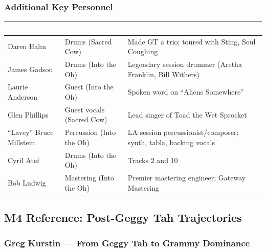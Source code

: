 \documentclass[11pt,letterpaper]{article}
\newcommand{\tableheader}[1]{\textbf{\sffamily\textcolor{white}{#1}}}
\begin{document}
\subsubsection{Additional Key Personnel}

\begin{center}
\begin{tabularx}{\textwidth}{L{3cm}L{3cm}X}
\toprule
{}
\tableheader{Name} & \tableheader{Role} & \tableheader{Note} \\
\midrule
Daren Hahn & Drums (Sacred Cow) & Made GT a trio; toured with Sting, Soul Coughing \\
James Gadson & Drums (Into the Oh) & Legendary session drummer (Aretha Franklin, Bill Withers) \\
Laurie Anderson & Guest (Into the Oh) & Spoken word on ``Aliens Somewhere'' \\
Glen Phillips & Guest vocals (Sacred Cow) & Lead singer of Toad the Wet Sprocket \\
``Lavey'' Bruce Millstein & Percussion (Into the Oh) & LA session percussionist/composer; synth, tabla, backing vocals \\
Cyril Atef & Drums (Into the Oh) & Tracks 2 and 10 \\
Bob Ludwig & Mastering (Into the Oh) & Premier mastering engineer; Gateway Mastering \\
\bottomrule
\end{tabularx}
\end{center}

\subsection{M4 Reference: Post-Geggy Tah Trajectories}

\subsubsection{Greg Kurstin --- From Geggy Tah to Grammy Dominance}
\end{document}
